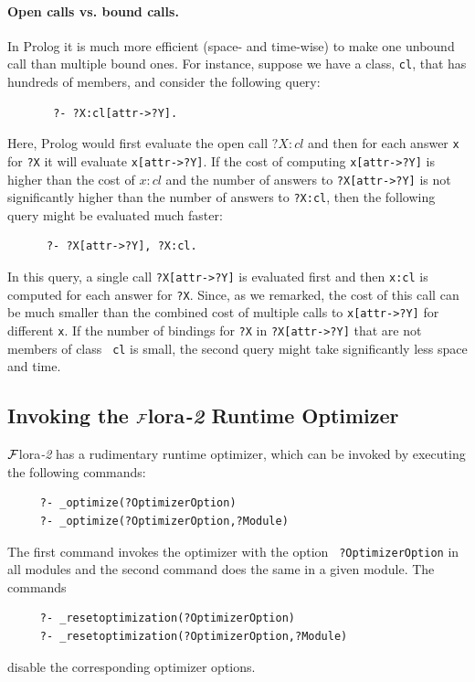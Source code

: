 \documentclass[11pt]{article}
\newcommand{\FLORA}{{\mbox{\sc ${\cal F}${lora}\rm\emph{-2}}}\xspace}
\begin{document}
\paragraph{Open calls vs. bound calls.}
In Prolog it is much more efficient (space- and
time-wise) to make one unbound call than multiple bound ones. For instance,
suppose we have a class, {\tt cl}, that has hundreds of members, and
consider the following query:
\begin{verbatim}
       ?- ?X:cl[attr->?Y].  
\end{verbatim}
Here, Prolog would first evaluate the open call $?X:cl$ and then for each
answer {\tt x} for {\tt ?X} it will evaluate {\tt x[attr->?Y]}.
If the cost of computing {\tt x[attr->?Y]} is higher than the cost of $x:cl$
and the number of answers to {\tt ?X[attr->?Y]} is not significantly
higher than the number of answers to {\tt ?X:cl}, then the following query
might be evaluated much faster:
\begin{verbatim}
      ?- ?X[attr->?Y], ?X:cl.  
\end{verbatim}
In this query, a single call {\tt ?X[attr->?Y]} is evaluated first and then
{\tt x:cl} is computed for each answer for {\tt ?X}.  Since, as we remarked,
the cost of this call can be much smaller than the combined cost of
multiple calls to {\tt x[attr->?Y]} for different {\tt x}.  If the number of
bindings for {\tt ?X} in {\tt ?X[attr->?Y]} that are not members of class {\tt
  cl} is small, the second query might take significantly less space and
time.

\subsection{Invoking the \FLORA Runtime Optimizer}
\label{sec-runtime-optimizer}

\FLORA has a rudimentary runtime optimizer, which can be invoked by
executing the following commands:
\begin{verbatim}
     ?- _optimize(?OptimizerOption)  
     ?- _optimize(?OptimizerOption,?Module)  
\end{verbatim}
The first command invokes the optimizer with the option {\tt
  ?OptimizerOption} in all modules and the second command does the same in a
given module. The commands
\begin{verbatim}
     ?- _resetoptimization(?OptimizerOption)  
     ?- _resetoptimization(?OptimizerOption,?Module)    
\end{verbatim}
disable the corresponding optimizer options.
\end{document}
